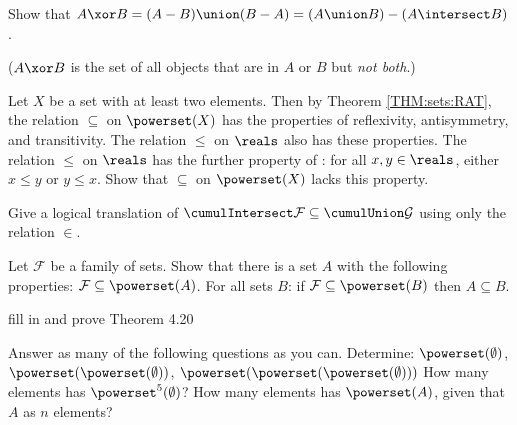 \documentclass{report}
\renewcommand{\leq}{\leqslant}
\begin{document}
\begin{Exercise} [number=21]
  Show that $A \xor B = (A - B) \union (B - A) = (A \union B) - (A \intersect B)$.
  
  ($A \xor B$ is the set of all objects that are in $A$ or $B$ but \emph{not both}.)
\end{Exercise}

\begin{Answer}
  \begin{structured_derivation}
  \end{structured_derivation}
\end{Answer}

\begin{Exercise} [number=23] 
  Let $X$ be a set with at least two elements. Then by Theorem \ref{THM:sets:RAT},
  the relation $\subseteq$ on $\powerset(X)$ has the properties of reflexivity,
  antisymmetry, and transitivity. The relation $\leq$ on $\reals$ also has these
  properties. The relation $\leq$ on $\reals$ has the further property of 
  : for all $x, y \in \reals$, either $x \leq y$ or $y \leq x$.
  Show that $\subseteq$ on $\powerset(X)$ lacks this property.
\end{Exercise}

\begin{Exercise} [number=26]
  Give a logical translation of $\cumulIntersect \mathcal{F} \subseteq
  \cumulUnion \mathcal{G}$ using only the relation $\in$.
\end{Exercise}

\begin{Exercise} [number=27]
  Let $\mathcal{F}$ be a family of sets. Show that there is a set $A$ with the 
  following properties:
  \Question $\mathcal{F} \subseteq \powerset(A)$.
  \Question For all sets $B$: if $\mathcal{F} \subseteq \powerset(B)$ then $A \subseteq B$.
\end{Exercise}

\begin{Exercise} [number=29]
  fill in and prove Theorem 4.20
\end{Exercise}

\begin{Exercise} [number=30]
Answer as many of the following questions as you can.
\Question Determine: $\powerset(\emptyset)$, $\powerset(\powerset(\emptyset))$, $\powerset(\powerset(\powerset(\emptyset)))$
\Question How many elements has $\powerset^{5}(\emptyset)$?
\Question How many elements has $\powerset(A)$, given that $A$ as $n$ elements?
\end{Exercise}
\end{document}
